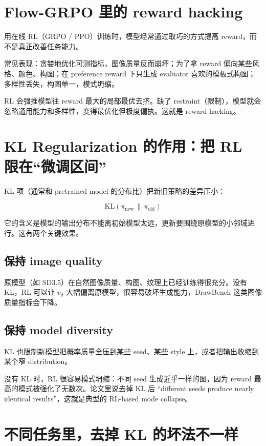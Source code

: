 \section{Flow-GRPO 里的 reward hacking}

用在线 RL（GRPO / PPO）训练时，模型经常通过取巧的方式提高 reward，而不是真正改善任务能力。

常见表现：贪婪地优化可测指标，图像质量反而崩坏；为了拿 reward 偏向某些风格、颜色、构图；在 preference reward 下只生成 evaluator 喜欢的模板式构图；多样性丢失，构图单一，模式坍缩。

RL 会强推模型往 reward 最大的局部最优去挤。缺了 restraint（限制），模型就会忽略通用能力和多样性，变得最优化但极度偏执。这就是 reward hacking。

\section{KL Regularization 的作用：把 RL 限在“微调区间”}

KL 项（通常和 pretrained model 的分布比）把新旧策略的差异压小：

\[
\text{KL}(\pi_{\text{new}} \,\|\, \pi_{\text{old}})
\]

它的含义是模型的输出分布不能离初始模型太远，更新要围绕原模型的小邻域进行。这有两个关键效果。

\subsection{保持 image quality}

原模型（如 SD3.5）在自然图像质量、构图、纹理上已经训练得很充分。没有 KL，RL 可以让 \(v_θ\) 大幅偏离原模型，很容易破坏生成能力，DrawBench 这类图像质量指标会下降。

\subsection{保持 model diversity}

KL 也限制新模型把概率质量全压到某些 seed、某些 style 上，或者把输出收缩到某个窄 distribution。

没有 KL 时，RL 很容易模式坍缩：不同 seed 生成近乎一样的图，因为 reward 最高的模式被强化了无数次。论文里说去掉 KL 后 “different seeds produce nearly identical results”，这就是典型的 RL-based mode collapse。

\section{不同任务里，去掉 KL 的坏法不一样}

